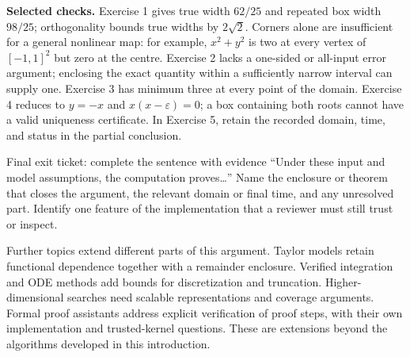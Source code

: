\textbf{Selected checks.} Exercise 1 gives true width $62/25$ and repeated
box width $98/25$; orthogonality bounds true widths by $2\sqrt2$.
Corners alone are insufficient for a general nonlinear map: for example,
$x^2+y^2$ is two at every vertex of $[-1,1]^2$ but zero at the centre.
Exercise 2 lacks a one-sided or all-input error argument; enclosing the
exact quantity within a sufficiently narrow interval can supply one.
Exercise 3 has minimum three at every point of the domain. Exercise 4
reduces to $y=-x$ and $x(x-\varepsilon)=0$; a box containing both roots
cannot have a valid uniqueness certificate. In Exercise 5, retain the
recorded domain, time, and status in the partial conclusion.

\begin{question}{Final exit ticket: complete the sentence with evidence}
``Under these input and model assumptions, the computation proves\ldots''
Name the enclosure or theorem that closes the argument, the relevant
domain or final time, and any unresolved part. Identify one feature of
the implementation that a reviewer must still trust or inspect.
\end{question}

Further topics extend different parts of this argument. Taylor models
retain functional dependence together with a remainder enclosure. Verified
integration and ODE methods add bounds for discretization and truncation.
Higher-dimensional searches need scalable representations and coverage
arguments. Formal proof assistants address explicit verification of proof
steps, with their own implementation and trusted-kernel questions. These
are extensions beyond the algorithms developed in this introduction.


